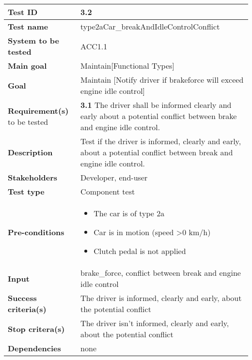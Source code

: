 	\begin{table}[H]
		\begin{tabular}{| p{4cm} | p{10cm} |}
			\hline \rowcolor{gray}
			{\bf Test ID} & 3.2 \\ \hline
			{\bf Test name} & type2aCar\_breakAndIdleControlConflict \\ \hline
			{\bf System to be tested} & ACC1.1\\ \hline
			{\bf Main goal} & Maintain[Functional Types]\\ \hline
			{\bf Goal} & Maintain [Notify driver if brakeforce will exceed engine idle control]\\ \hline
			{\bf Requirement(s)} to be tested & {\bf 3.1} The driver shall be informed clearly and early about a potential conflict between brake and engine idle control.\\ \hline
			{\bf Description} & Test if the driver is informed, clearly and early, about a potential conflict between break and engine idle control.\\ \hline
			{\bf Stakeholders} & Developer, end-user \\ \hline
			{\bf Test type} &  Component test \\ \hline
			{\bf Pre-conditions} & 
				\begin{itemize}
					\item The car is of type 2a
					\item Car is in motion (speed \textgreater 0 km/h)
					\item Clutch pedal is not applied
				\end{itemize}\\ \hline
			{\bf Input} & brake\_force, conflict between break and engine idle control \\ \hline
			{\bf Success criteria(s)} & The driver is informed, clearly and early, about the potential conflict \\ \hline
			{\bf Stop critera(s)} &  The driver isn’t informed, clearly and early, about the potential conflict \\ \hline
			{\bf Dependencies} & none \\ \hline
		\end{tabular}
	\end{table}
